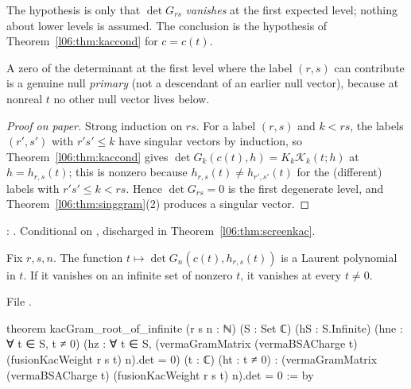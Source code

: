 \begin{dictionary}
The hypothesis is only that $\det G_{rs}$ \emph{vanishes} at the first expected level; nothing about
lower levels is assumed. The conclusion is the hypothesis  of Theorem~\ref{l06:thm:kaccond} for
$c = c(t)$.
\end{dictionary}

\begin{physics}
A zero of the determinant at the first level where the label $(r,s)$ can contribute is a genuine null
\emph{primary} (not a descendant of an earlier null vector), because at nonreal $t$ no other null vector
lives below.
\end{physics}

\begin{proof}[Proof on paper]
Strong induction on $rs$. For a label $(r,s)$ and $k<rs$, the labels $(r',s')$ with $r's'\le k$ have
singular vectors by induction, so Theorem~\ref{l06:thm:kaccond} gives $\det G_k(c(t),h) = K_k\mathcal K_k(t;h)$
at $h = h_{r,s}(t)$; this is nonzero because $h_{r,s}(t)\ne h_{r',s'}(t)$ for the (different) labels with
$r's'\le k<rs$. Hence $\det G_{rs} = 0$ is the first degenerate level, and
Theorem~\ref{l06:thm:singgram}(2) produces a singular vector.
\end{proof}

\begin{status}
\allowbreak{}\allowbreak{}\allowbreak{}\allowbreak{}\allowbreak{}: \lean{[propext, Classical.}\allowbreak{}\allowbreak\lean{sound]}. Conditional on
, discharged in Theorem~\ref{l06:thm:screenkac}.
\end{status}

\begin{theorem}\label{l06:thm:laurent}
Fix $r,s,n$. The function $t\mapsto\det G_n(c(t),h_{r,s}(t))$ is a Laurent polynomial in $t$. If it vanishes on
an infinite set of nonzero $t$, it vanishes at every $t\ne0$.
\end{theorem}

File .
\begin{leancode}
theorem kacGram_root_of_infinite (r s n : ℕ) (S : Set ℂ) (hS : S.Infinite)
    (hne : ∀ t ∈ S, t ≠ 0)
    (hz : ∀ t ∈ S, (vermaGramMatrix (vermaBSACharge t)
      (fusionKacWeight r s t) n).det = 0) (t : ℂ) (ht : t ≠ 0) :
    (vermaGramMatrix (vermaBSACharge t) (fusionKacWeight r s t) n).det = 0 := by
\end{leancode}

